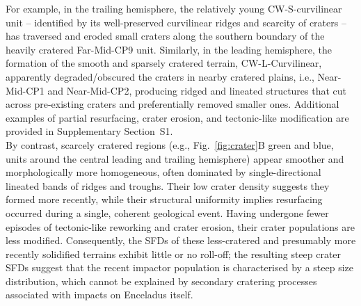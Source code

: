 \documentclass[preprint,11pt,3p,times,authoryear]{elsarticle}
\begin{document}
For example, in the trailing hemisphere, the relatively young CW-S-curvilinear unit -- identified by its well-preserved curvilinear ridges and scarcity of craters -- has traversed and eroded small craters along the southern boundary of the heavily cratered Far-Mid-CP9 unit. Similarly, in the leading hemisphere, the formation of the smooth and sparsely cratered terrain, CW-L-Curvilinear, apparently degraded/obscured the craters in nearby cratered plains, i.e., Near-Mid-CP1 and Near-Mid-CP2, producing ridged and lineated structures that cut across pre-existing craters and preferentially removed smaller ones. Additional examples of partial resurfacing, crater erosion, and tectonic-like modification are provided in Supplementary Section~S1.\\

By contrast, scarcely cratered regions (e.g., Fig.~\ref{fig:crater}B green and blue, units around the central leading and trailing hemisphere) appear smoother and morphologically more homogeneous, often dominated by single-directional lineated bands of ridges and troughs. Their low crater density suggests they formed more recently, while their structural uniformity implies resurfacing occurred during a single, coherent geological event. Having undergone fewer episodes of tectonic-like reworking and crater erosion, their crater populations are less modified. 
Consequently, the SFDs of these less-cratered and presumably more recently solidified terrains exhibit little or no roll-off; the resulting steep crater SFDs suggest that the recent impactor population is characterised by a steep size distribution, which cannot be explained by secondary cratering processes associated with impacts on Enceladus itself.\normalcolor\\
\end{document}
